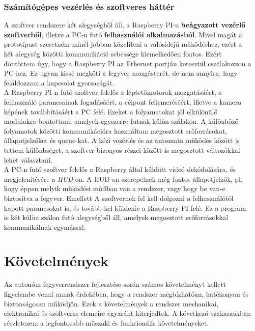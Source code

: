\subsubsection*{Számítógépes vezérlés és szoftveres háttér}
A szoftver rendszere két alegységből áll, a Raspberry PI-n \textbf{beágyazott vezérlő szoftverből}, illetve a PC-n futó \textbf{felhasználói alkalmazásból}. Mivel magát a prototípust szeretném minél jobban közelíteni a valósidejű működéshez, ezért a két alegység közötti kommunikáció sebessége kiemelkedően fontos. Ezért döntöttem úgy, hogy a Raspberry PI az Ethernet portján keresztül csatlakozzon a PC-hez. Ez ugyan kissé megköti a fegyver mozgásterét, de nem annyira, hogy feláldozzam a kapcsolat gyorsaságát. \\

A Raspberry PI-n futó szoftver felelős a léptetőmotorok mozgatásáért, a felhasználó parancsainak fogadásáért, a célpont felismeréséért, illetve a  kamera képének továbbításáért a PC felé. Ezeket a folyamatokat jól elkülönülő modulokra bontottam, amelyek egyszerre futnak külön szálakon. A különböző folyamatok közötti kommunikációra használtam megosztott erőforrásokat, állapotjelzőket és queue-kat. A kézi vezérlés és az automata működés között is tettem különbséget, a szoftver bizonyos részei között is megosztott változókkal lehet választani. \\

A PC-n futó szoftver felelős a Raspberry által küldött videó dekódolására, és megjelenítésére a \textsl{HUD}-on. A HUD-on szerepelnek még fontos állapotjelzők, pl. hogy éppen melyik működési módban van a rendszer, vagy hogy be van-e biztosítva a fegyver. Emellett A szoftvernek fel kell dolgozni a felhasználótól kapott parancsokat is, és tovább kel küldenie a Raspberry PI felé. Ez a program is két külön szálon futó alegységből áll, amelyek megosztott erőforrásokkal kommunikálnak egymással. 

\pagebreak

\section{Követelmények}\label{sec:kov}


Az autonóm fegyverrendszer fejlesztése során számos követelményt kellett figyelembe venni annak érdekében, hogy a rendszer megbízhatóan, hatékonyan és biztonságosan működjön. Ezek a követelmények a rendszer mechanikai, elektronikai és szoftveres elemeire egyaránt kiterjedtek. A következő szakaszokban részletezem a legfontosabb műszaki és funkcionális követelményeket.

